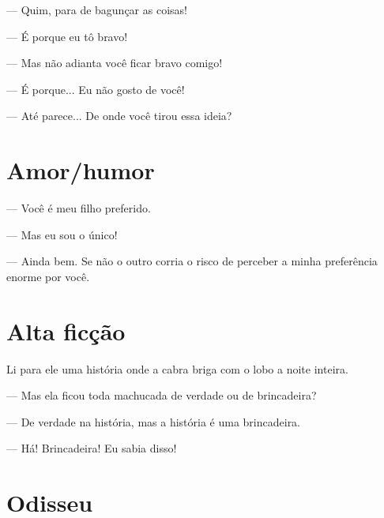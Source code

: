 {\parindent0pt\parskip1pt\raggedright
--- Quim, para de bagunçar as coisas!

--- É porque eu tô bravo!

--- Mas não adianta você ficar bravo comigo!

--- É porque... Eu não gosto de você!

--- Até parece... De onde você tirou essa ideia?

\chapter{Amor/humor}\label{amorhumor}

--- Você é meu filho preferido.

--- Mas eu sou o único!

--- Ainda bem. Se não o outro corria o risco de perceber a minha
preferência enorme por você.

\chapter{Alta ficção}\label{alta-ficuxe7uxe3o}

Li para ele uma história onde a cabra briga com o lobo a noite inteira.

--- Mas ela ficou toda machucada de verdade ou de brincadeira?

--- De verdade na história, mas a história é uma brincadeira.

--- Há! Brincadeira! Eu sabia disso!}

\chapter{Odisseu}\label{odisseu}

